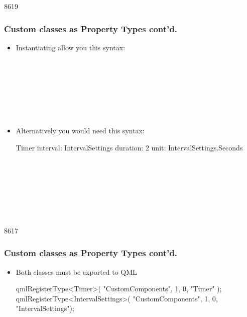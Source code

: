 \begin{slide}[fragile]{8619}\frametitle{Custom classes as Property Types cont'd.}
\begin{itemize}
\item Instantiating allow you this syntax:\\\vspace{2mm}
\begin{qml}
\\
\\
\\
\\
\qtt{~~~~\}}\\
\qtt{\}}\\\vspace{5mm}
\end{qml}

\item Alternatively you would need this syntax:\\\vspace{2mm}
\begin{EXCLUDE}
Timer {
    interval: IntervalSettings {
        duration: 2
        unit: IntervalSettings.Seconds
    }
}
\end{EXCLUDE}
\begin{qml}
\\
\\
\\
\\
\qtt{~~~~\}}\\
\qtt{\}}\\
\end{qml}
\end{itemize}
\end{slide}

\begin{slide}[fragile]{8617}\frametitle{Custom classes as Property Types cont'd.}
  \begin{itemize}
  \item Both classes must be   exported to QML\vspace{5mm}
\begin{cpp}
qmlRegisterType<Timer>( "CustomComponents", 1, 0, "Timer" );
qmlRegisterType<IntervalSettings>( "CustomComponents", 
                                   1, 0, "IntervalSettings");
\end{cpp}
  \end{itemize}\vspace{5mm}
\end{slide}


